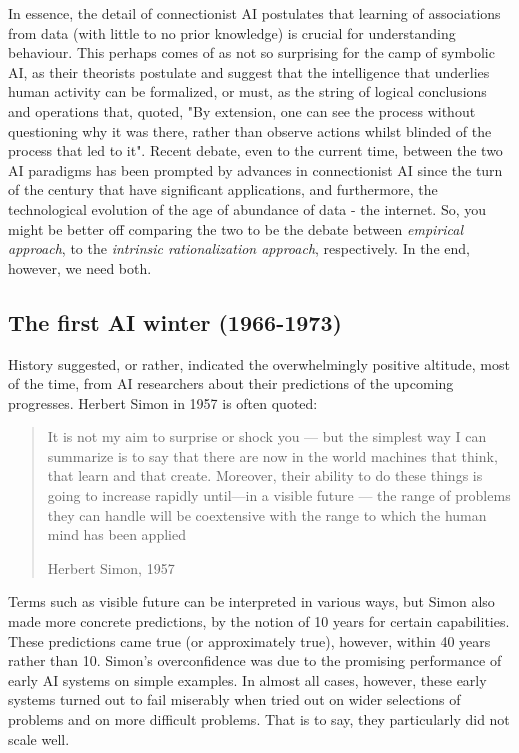 In essence, the detail of connectionist AI postulates that learning of associations from data (with little to no prior knowledge) is crucial for understanding behaviour. This perhaps comes of as not so surprising for the camp of symbolic AI, as their theorists postulate and suggest that the intelligence that underlies human activity can be formalized, or must, as the string of logical conclusions and operations that, quoted, "By extension, one can see the process without questioning why it was there, rather than observe actions whilst blinded of the process that led to it". Recent debate, even to the current time, between the two AI paradigms has been prompted by advances in connectionist AI since the turn of the century that have significant applications, and furthermore, the technological evolution of the age of abundance of data - the internet. So, you might be better off comparing the two to be the debate between \textit{empirical approach}, to the \textit{intrinsic rationalization approach}, respectively. In the end, however, we need both. \cite{Goel_2022}

\subsection{The first AI winter (1966-1973)}

History suggested, or rather, indicated the overwhelmingly positive altitude, most of the time, from AI researchers about their predictions of the upcoming progresses. Herbert Simon in 1957 is often quoted: 
\blockquote[Herbert Simon, 1957]{It is not my aim to surprise or shock you --- but the simplest way I can summarize is to say that there are now in the world machines that think, that learn and that create. Moreover, their ability to do these things is going to increase rapidly until—in a visible future --- the range of problems they can handle will be coextensive with the range to which the human mind has been applied}

Terms such as visible future can be interpreted in various ways, but Simon also made more concrete predictions, by the notion of 10 years for certain capabilities. These predictions came true (or approximately true), however, within 40 years rather than 10. Simon's overconfidence was due to the promising performance of early AI systems on simple examples. In almost all cases, however, these early systems turned out to fail miserably when tried out on wider selections of problems and on more difficult problems. That is to say, they particularly did not scale well. 

